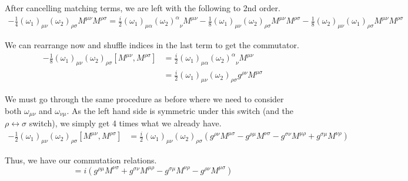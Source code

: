 \documentclass[12pt]{article}
\begin{document}
After cancelling matching terms, we are left with the following to 2nd order.
\begin{align*}
    -\frac{1}{4}(\omega_1)_{\mu\nu}(\omega_2)_{\rho\sigma}M^{\mu\nu}M^{\rho\sigma}=\frac{i}{2}(\omega_1)_{\mu\alpha}{(\omega_2)^\alpha}_\nu M^{\mu\nu}-\frac{1}{8}(\omega_1)_{\mu\nu}(\omega_2)_{\rho\sigma}M^{\mu\nu}M^{\rho\sigma}-\frac{1}{8}(\omega_2)_{\mu\nu}(\omega_1)_{\rho\sigma}M^{\mu\nu}M^{\rho\sigma}
\end{align*}

We can rearrange now and shuffle indices in the last term to get the commutator.
\begin{align*}
    -\frac{1}{8}(\omega_1)_{\mu\nu}(\omega_2)_{\rho\sigma}[M^{\mu\nu},M^{\rho\sigma}]&=\frac{i}{2}(\omega_1)_{\mu\alpha}{(\omega_2)^\alpha}_\nu M^{\mu\nu} \\
    &= \frac{i}{2}(\omega_1)_{\mu\nu}(\omega_2)_{\rho\sigma} g^{\rho \nu}M^{\mu\sigma}
\end{align*}

We must go through the same procedure as before where we need to consider both $\omega_{\mu\nu}$ and $\omega_{\nu\mu}$. As the left hand side is symmetric under this switch (and the $\rho\leftrightarrow\sigma$ switch), we simply get 4 times what we already have.
\begin{align*}
    -\frac{1}{2}(\omega_1)_{\mu\nu}(\omega_2)_{\rho\sigma}[M^{\mu\nu},M^{\rho\sigma}]&=\frac{i}{2}(\omega_1)_{\mu\nu}(\omega_2)_{\rho\sigma}(g^{\rho \nu}M^{\mu\sigma}-g^{\rho \mu}M^{\nu\sigma}-g^{\sigma \nu}M^{\mu\rho}+g^{\sigma \mu}M^{\nu\rho})
\end{align*}

Thus, we have our commutation relations.
\begin{equation}
    [M^{\mu\nu},M^{\rho\sigma}]=i(g^{\rho \mu}M^{\nu\sigma}+g^{\sigma \nu}M^{\mu\rho}-g^{\sigma \mu}M^{\nu\rho}-g^{\rho \nu}M^{\mu\sigma})
\end{equation}
\end{document}
